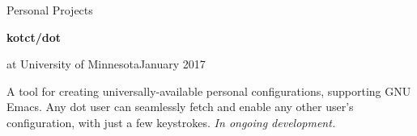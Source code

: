 \begin{minipage}[t]{0.665\textwidth}
  \vspace{10pt}

  {\sectionfont Personal Projects}

  \vspace{5pt}
  \textbf{kotct/dot}\quad{}
  \begin{adjustwidth}{10pt}{}
    \emph{} at University of Minnesota\hfill January 2017

    A tool for creating universally-available personal configurations, supporting GNU Emacs.
    Any dot user can seamlessly fetch and enable any other user's configuration, with just a few keystrokes.
    \emph{In ongoing development.}
  \end{adjustwidth}




\end{minipage}

